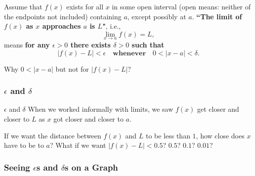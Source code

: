 \documentclass[Cal1Spr16Lectures.tex]{subfiles}
\begin{document}
\begin{frame}\footnotesize
\begin{dfn}
Assume that $f(x)$ exists for all $x$ in some open interval (open means: neither of the endpoints not included) containing $a$, except possibly at $a$.  \textbf{``The limit of $f(x)$ as $x$ approaches $a$ is $L$"}, i.e.,
\[\lim_{x \to a}f(x)=L,\]
means \textbf{for any $\epsilon > 0$ there exists $\delta > 0$ such that} 
\[|f(x)-L|<\epsilon \quad \textbf{whenever} \quad 0<|x-a|<\delta.\]
\end{dfn}
\begin{que}
Why $0<|x-a|$ but not for $|f(x)-L|$?
\end{que}

\end{frame}

\subsubsection{$\epsilon$ and $\delta$}

\begin{frame}{\small $\epsilon$ and $\delta$}\small
When we worked informally with limits, we saw $f(x)$ get closer and closer to $L$ as $x$ got closer and closer to $a$. 

\begin{que} If we want the distance between $f(x)$ and $L$ to be less than $1$, how close does $x$ have to be to $a$? What if we want $|f(x)-L|<0.5$?  $0.5$? $0.1$? $0.01$?  
\end{que}
\end{frame}

\subsubsection{Seeing $\epsilon$s and $\delta$s on a Graph}
\end{document}
